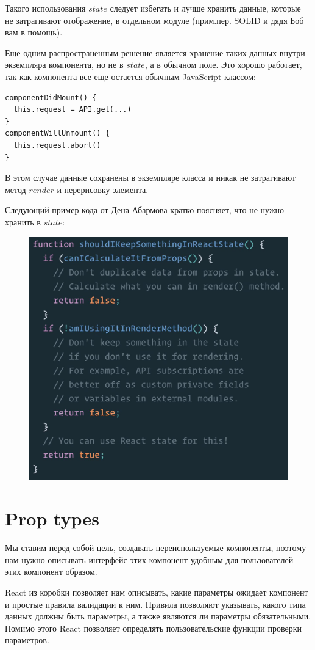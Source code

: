 Такого использования $state$ следует избегать и лучше хранить данные, которые не затрагивают отображение, в отдельном модуле (прим.пер. SOLID и дядя Боб вам в помощь).

Еще одним распространенным решение является хранение таких данных внутри экземпляра компонента, но не в $state$, а в обычном поле. Это хорошо работает, так как компонента все еще остается обычным JavaScript классом:

\begin{lstlisting}
componentDidMount() {
  this.request = API.get(...)
}
componentWillUnmount() {
  this.request.abort()
}
\end{lstlisting}

В этом случае данные сохранены в экземпляре класса и никак не затрагивают метод $render$ и перерисовку элемента.

Следующий пример кода от Дена Абармова кратко поясняет, что не нужно хранить в $state$:

\begin{figure}[h]
	\includegraphics[width=.8\textwidth]{images/dan-cheat-sheet}
\end{figure}


\section{Prop types}

Мы ставим перед собой цель, создавать переиспользуемые компоненты, поэтому нам нужно описывать интерфейс этих компонент удобным для пользователей этих компонент образом.

React из коробки позволяет нам описывать, какие параметры ожидает компонент и простые правила валидации к ним. Привила позволяют указывать, какого типа данных должны быть параметры, а также являются ли параметры обязательными. Помимо этого React позволяет определять пользовательские функции проверки параметров.

